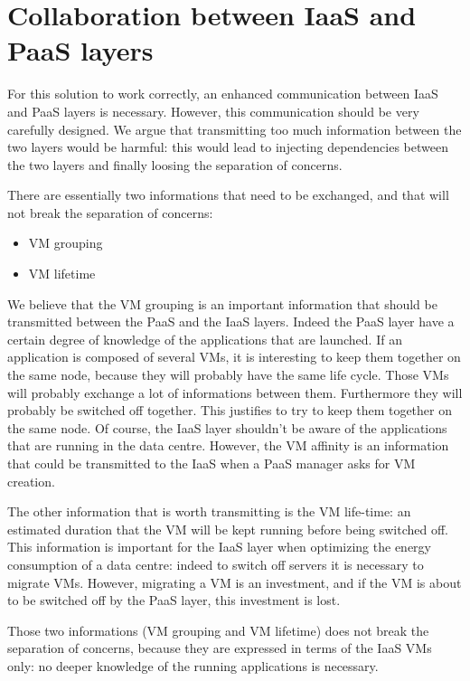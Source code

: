 
\section{Collaboration between IaaS and PaaS layers}

For this solution to work correctly, an enhanced communication between IaaS and PaaS layers is necessary.
However, this communication should be very carefully designed.
We argue that transmitting too much information between the two layers would be harmful: this would lead to injecting dependencies between the two layers and finally loosing the separation of concerns.

There are essentially two informations that need to be exchanged, and that will not break the separation of concerns:
\begin{itemize}
  \item VM grouping
  \item VM lifetime
\end{itemize}

We believe that the VM grouping is an important information that should be transmitted between the PaaS and the IaaS layers.
Indeed the PaaS layer have a certain degree of knowledge of the applications that are launched.
If an application is composed of several VMs, it is interesting to keep them together on the same node, because they will probably have the same life cycle.
Those VMs will probably exchange a lot of informations between them. Furthermore they will probably be switched off together.
This justifies to try to keep them together on the same node.
Of course, the IaaS layer shouldn't be aware of the applications that are running in the data centre.
However, the VM affinity is an information that could be transmitted to the IaaS when a PaaS manager asks for VM creation.

The other information that is worth transmitting is the VM life-time: an estimated duration that the VM will be kept running before being switched off.
This information is important for the IaaS layer when optimizing the energy consumption of a data centre: indeed to switch off servers it is necessary to migrate VMs.
However, migrating a VM is an investment, and if the VM is about to be switched off by the PaaS layer, this investment is lost.

Those two informations (VM grouping and VM lifetime) does not break the separation of concerns, because they are expressed in terms of the IaaS VMs only: no deeper knowledge of the running applications is necessary.
